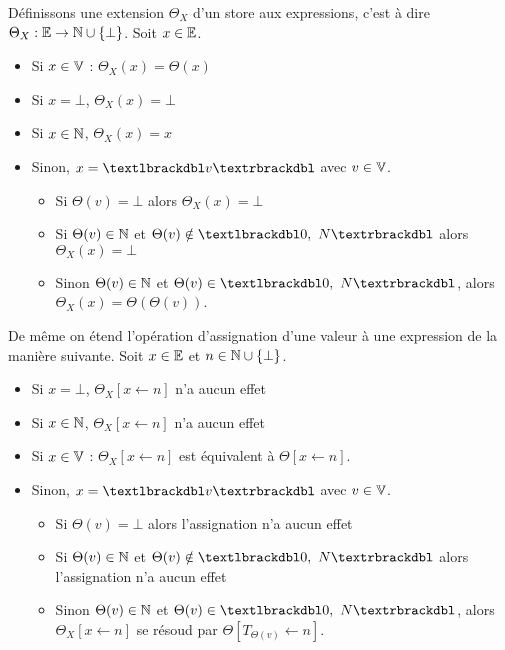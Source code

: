 \begin{defi}
 Définissons une extension $\Theta_X$ d'un store aux expressions, c'est à dire $\Theta_X:\mathbb E\rightarrow\mathbb N\cup\{\bot\}$. Soit $x\in\mathbb E$.
 \begin{itemize}
  \item Si $x\in\mathbb V$ : $\Theta_X(x)=\Theta(x)$
  \item Si $x=\bot$, $\Theta_X(x)=\bot$
  \item Si $x\in\mathbb N$, $\Theta_X(x)=x$
  \item Sinon, $x=\textlbrackdbl v\textrbrackdbl$ avec $v\in\mathbb V$.
  \begin{itemize}
   \item Si $\Theta(v)=\bot$ alors $\Theta_X(x)=\bot$
   \item Si $\Theta(v)\in\mathbb N$ et $\Theta(v)\notin\textlbrackdbl 0,\ N\textrbrackdbl$ alors $\Theta_X(x)=\bot$
   \item Sinon $\Theta(v)\in\mathbb N$ et $\Theta(v)\in\textlbrackdbl 0,\ N\textrbrackdbl$, alors $\Theta_X(x)=\Theta(\Theta(v))$.
  \end{itemize}
 \end{itemize}
  De même on étend l'opération d'assignation d'une valeur à une expression de la manière suivante. Soit $x\in\mathbb E$ et $n\in\mathbb N\cup\{\bot\}$.
  \begin{itemize}
  \item Si $x=\bot$, $\Theta_X[x\leftarrow n]$ n'a aucun effet
  \item Si $x\in\mathbb N$, $\Theta_X[x\leftarrow n]$ n'a aucun effet
  \item Si $x\in\mathbb V$ : $\Theta_X[x\leftarrow n]$ est équivalent à $\Theta[x\leftarrow n]$.
  \item Sinon, $x=\textlbrackdbl v\textrbrackdbl$ avec $v\in\mathbb V$.
    \begin{itemize}
   \item Si $\Theta(v)=\bot$ alors l'assignation n'a aucun effet
   \item Si $\Theta(v)\in\mathbb N$ et $\Theta(v)\notin\textlbrackdbl 0,\ N\textrbrackdbl$ alors l'assignation n'a aucun effet
   \item Sinon $\Theta(v)\in\mathbb N$ et $\Theta(v)\in\textlbrackdbl 0,\ N\textrbrackdbl$, alors $\Theta_X[x\leftarrow n]$ se résoud par $\Theta[T_{\Theta(v)}\leftarrow n]$.
  \end{itemize}
  \end{itemize}
\label{def:sem_store_dynamique_pointeurs}
\end{defi}

